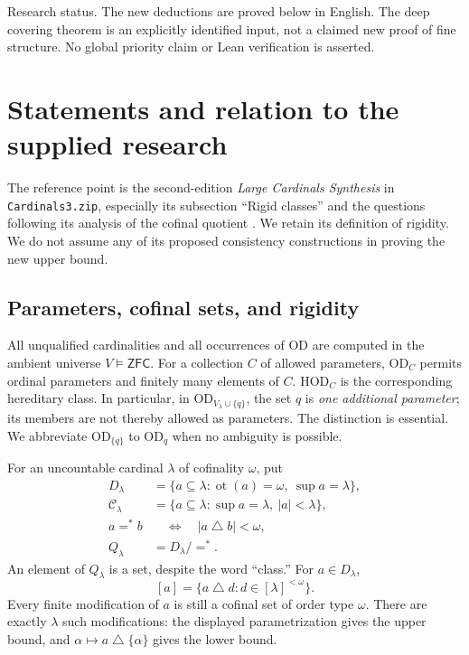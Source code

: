 \documentclass[11pt,letterpaper]{article}
\theoremstyle{definition}
\numberwithin{equation}{section}
\newcommand{\ZFC}{\mathsf{ZFC}}
\newcommand{\HOD}{\mathrm{HOD}}
\newcommand{\OD}{\mathrm{OD}}
\newcommand{\ot}{\operatorname{ot}}
\newcommand{\Clam}{\mathcal C_\lambda}
\newcommand{\symdiff}{\mathbin{\triangle}}
\begin{document}
\vspace{5pt}
{\small\color{Muted}Research status. The new deductions are proved below in English.
The deep covering theorem is an explicitly identified input, not a claimed new proof
of fine structure. No global priority claim or Lean verification is asserted.}

\newpage
\tableofcontents
\newpage

\section{Statements and relation to the supplied research}\label{sec:statements}

The reference point is the second-edition \emph{Large Cardinals Synthesis} in
\nolinkurl{Cardinals3.zip}, especially its subsection ``Rigid classes'' and the
questions following its analysis of the cofinal quotient \cite{Dossier}.
We retain its definition of rigidity. We do not assume any of its proposed
consistency constructions in proving the new upper bound.

\subsection{Parameters, cofinal sets, and rigidity}

All unqualified cardinalities and all occurrences of $\OD$ are computed in the
ambient universe $V\models\ZFC$. For a collection $C$ of allowed parameters,
$\OD_C$ permits ordinal parameters and finitely many elements of $C$.
$\HOD_C$ is the corresponding hereditary class. In particular, in
$\OD_{V_\lambda\cup\{q\}}$, the set $q$ is \emph{one additional parameter};
its members are not thereby allowed as parameters. The distinction is essential.
We abbreviate $\OD_{\{q\}}$ to $\OD_q$ when no ambiguity is possible.

For an uncountable cardinal $\lambda$ of cofinality $\omega$, put
\begin{align*}
 D_\lambda&=\{a\subseteq\lambda:\ot(a)=\omega,\ \sup a=\lambda\},\\
 \Clam&=\{a\subseteq\lambda:\sup a=\lambda,\ |a|<\lambda\},\\
 a=^*b&\quad\Longleftrightarrow\quad |a\symdiff b|<\omega,\\
 Q_\lambda&=D_\lambda/{=^*}.
\end{align*}
An element of $Q_\lambda$ is a set, despite the word ``class.'' For $a\in D_\lambda$,
\[
 [a]=\{a\symdiff d:d\in[\lambda]^{<\omega}\}.
\]
Every finite modification of $a$ is still a cofinal set of order type $\omega$.
There are exactly $\lambda$ such modifications: the displayed parametrization gives
the upper bound, and $\alpha\mapsto a\symdiff\{\alpha\}$ gives the lower bound.
\end{document}
